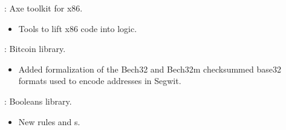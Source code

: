 
\begin{frame}

\implibtitle

:
Axe toolkit for x86.
\begin{itemize}
\item Tools to lift x86 code into logic.
\end{itemize}

\end{frame}


\begin{frame}

\implibtitle

:
Bitcoin library.
\begin{itemize}
\item Added formalization of the Bech32 and Bech32m checksummed base32 formats
      used to encode addresses in Segwit.
\end{itemize}

\end{frame}


\begin{frame}

\implibtitle

:
Booleans library.
\begin{itemize}
\item New rules and s.
\end{itemize}

\end{frame}


